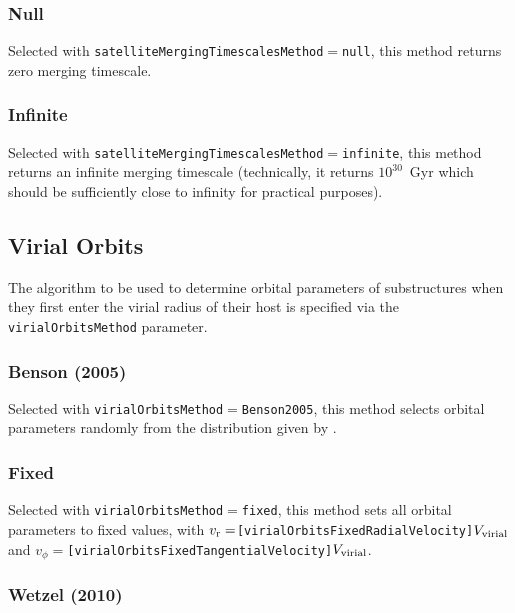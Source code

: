 \subsubsection{Null}\label{phys:satelliteMergingTimescales:satelliteMergingTimescalesNull}

Selected with {\tt satelliteMergingTimescalesMethod}$=${\tt null}, this method returns zero merging timescale.

\subsubsection{Infinite}\label{phys:satelliteMergingTimescales:satelliteMergingTimescalesInfinite}

Selected with {\tt satelliteMergingTimescalesMethod}$=${\tt infinite}, this method returns an infinite merging timescale (technically, it returns $10^{30}$~Gyr which should be sufficiently close to infinity for practical purposes).

\subsection{Virial Orbits}

The algorithm to be used to determine orbital parameters of substructures when they first enter the virial radius of their host is specified via the {\tt virialOrbitsMethod} parameter.

\subsubsection{Benson (2005)}

Selected with {\tt virialOrbitsMethod}$=${\tt Benson2005}, this method selects orbital parameters randomly from the distribution given by \cite{benson_orbital_2005}.

\subsubsection{Fixed}

Selected with {\tt virialOrbitsMethod}$=${\tt fixed}, this method sets all orbital parameters to fixed values, with $v_{\rm r}=${\tt [virialOrbitsFixedRadialVelocity]}$V_{\rm virial}$ and  $v_\phi=${\tt [virialOrbitsFixedTangentialVelocity]}$V_{\rm virial}$.

\subsubsection{Wetzel (2010)}


